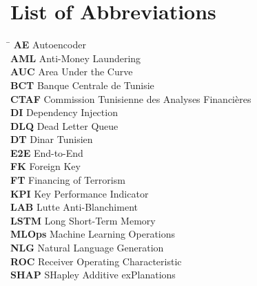 \documentclass[11pt,a4paper,oneside]{report}
\begin{document}
\chapter*{List of Abbreviations}
\begin{tabbing}
\hspace{2.8cm}\= \kill
\textbf{AE} \> Autoencoder \\
\textbf{AML} \> Anti-Money Laundering \\
\textbf{AUC} \> Area Under the Curve \\
\textbf{BCT} \> Banque Centrale de Tunisie \\
\textbf{CTAF} \> Commission Tunisienne des Analyses Financi\`eres \\
\textbf{DI} \> Dependency Injection \\
\textbf{DLQ} \> Dead Letter Queue \\
\textbf{DT} \> Dinar Tunisien \\
\textbf{E2E} \> End-to-End \\
\textbf{FK} \> Foreign Key \\
\textbf{FT} \> Financing of Terrorism \\
\textbf{KPI} \> Key Performance Indicator \\
\textbf{LAB} \> Lutte Anti-Blanchiment \\
\textbf{LSTM} \> Long Short-Term Memory \\
\textbf{MLOps} \> Machine Learning Operations \\
\textbf{NLG} \> Natural Language Generation \\
\textbf{ROC} \> Receiver Operating Characteristic \\
\textbf{SHAP} \> SHapley Additive exPlanations \\
\end{tabbing}

\clearpage
{}











\end{document}
